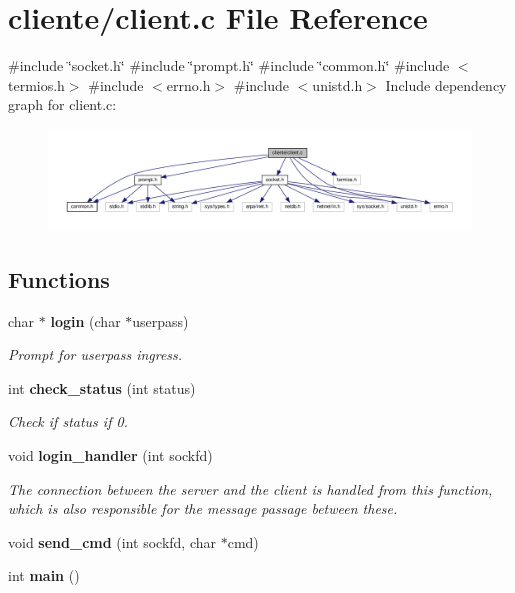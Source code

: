 \section{cliente/client.c File Reference}
\label{client_8c}
{\ttfamily \#include \char`\"{}socket.\+h\char`\"{}}\newline
{\ttfamily \#include \char`\"{}prompt.\+h\char`\"{}}\newline
{\ttfamily \#include \char`\"{}common.\+h\char`\"{}}\newline
{\ttfamily \#include $<$termios.\+h$>$}\newline
{\ttfamily \#include $<$errno.\+h$>$}\newline
{\ttfamily \#include $<$unistd.\+h$>$}\newline
Include dependency graph for client.\+c\+:\nopagebreak
\begin{figure}[H]
\begin{center}
\leavevmode
\includegraphics[width=350pt]{client_8c__incl}
\end{center}
\end{figure}
\subsection*{Functions}
\begin{DoxyCompactItemize}
\item 
char $\ast$ \textbf{ login} (char $\ast$userpass)
\begin{DoxyCompactList}\small\item\em Prompt for userpass ingress. \end{DoxyCompactList}\item 
int \textbf{ check\+\_\+status} (int status)
\begin{DoxyCompactList}\small\item\em Check if status if 0. \end{DoxyCompactList}\item 
void \textbf{ login\+\_\+handler} (int sockfd)
\begin{DoxyCompactList}\small\item\em The connection between the server and the client is handled from this function, which is also responsible for the message passage between these. \end{DoxyCompactList}\item 
void \textbf{ send\+\_\+cmd} (int sockfd, char $\ast$cmd)
\item 
int \textbf{ main} ()
\end{DoxyCompactItemize}


